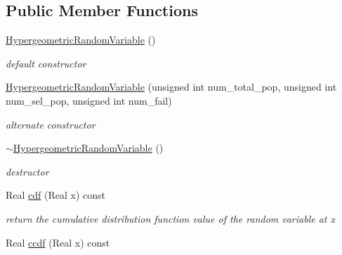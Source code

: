 \subsection*{Public Member Functions}
\begin{DoxyCompactItemize}
\item 
\hyperlink{classPecos_1_1HypergeometricRandomVariable_a134b5b3f9ccb8a93e07c5c62083001bd}{Hypergeometric\+Random\+Variable} ()\label{classPecos_1_1HypergeometricRandomVariable_a134b5b3f9ccb8a93e07c5c62083001bd}

\begin{DoxyCompactList}\small\item\em default constructor \end{DoxyCompactList}\item 
\hyperlink{classPecos_1_1HypergeometricRandomVariable_aa375499baa668f2f762ec824b1d8a978}{Hypergeometric\+Random\+Variable} (unsigned int num\+\_\+total\+\_\+pop, unsigned int num\+\_\+sel\+\_\+pop, unsigned int num\+\_\+fail)\label{classPecos_1_1HypergeometricRandomVariable_aa375499baa668f2f762ec824b1d8a978}

\begin{DoxyCompactList}\small\item\em alternate constructor \end{DoxyCompactList}\item 
\hyperlink{classPecos_1_1HypergeometricRandomVariable_a899daf62a239bccfe0eb02eac9057b8a}{$\sim$\+Hypergeometric\+Random\+Variable} ()\label{classPecos_1_1HypergeometricRandomVariable_a899daf62a239bccfe0eb02eac9057b8a}

\begin{DoxyCompactList}\small\item\em destructor \end{DoxyCompactList}\item 
Real \hyperlink{classPecos_1_1HypergeometricRandomVariable_addd564e7f4f314e12d38df74d845f0d8}{cdf} (Real x) const \label{classPecos_1_1HypergeometricRandomVariable_addd564e7f4f314e12d38df74d845f0d8}

\begin{DoxyCompactList}\small\item\em return the cumulative distribution function value of the random variable at x \end{DoxyCompactList}\item 
Real \hyperlink{classPecos_1_1HypergeometricRandomVariable_a23c3b599e7e4788a9a5e9e93c3dbaf4d}{ccdf} (Real x) const \label{classPecos_1_1HypergeometricRandomVariable_a23c3b599e7e4788a9a5e9e93c3dbaf4d}


\end{DoxyCompactItemize}
